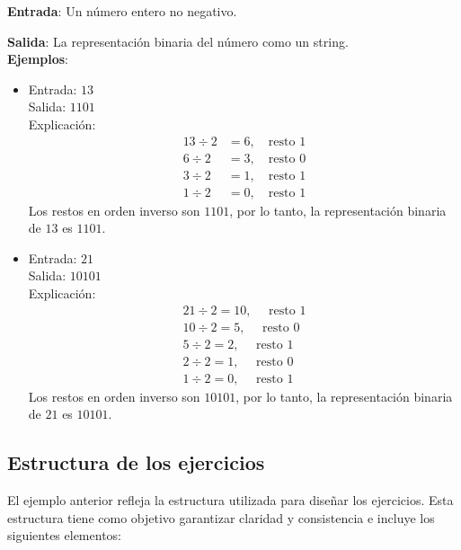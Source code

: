 \documentclass{article}
\begin{document}
\begin{enumerate}[label=\alph*)]
    \textbf{Entrada}: Un número entero no negativo.

    \textbf{Salida}: La representación binaria del número como un string.\\

    \textbf{Ejemplos}:
    \begin{itemize}
        \item Entrada: \( 13 \) \\
        Salida: \( \text{1101} \) \\
        Explicación:
        \[
        \begin{aligned}
        13 \div 2 &= 6, \quad \text{resto } 1 \\
        6 \div 2 &= 3, \quad \text{resto } 0 \\
        3 \div 2 &= 1, \quad \text{resto } 1 \\
        1 \div 2 &= 0, \quad \text{resto } 1
        \end{aligned}
        \]
        Los restos en orden inverso son \(1101\), por lo tanto, la representación binaria de \(13\) es \(1101\).

        \item Entrada: \( 21 \) \\
        Salida: \( \text{10101} \) \\
        Explicación:
        \[
        \begin{aligned}
        21 \div 2 = 10,\quad \text{ resto } 1 \\
        10 \div 2 = 5,\quad \text{ resto } 0 \\
        5 \div 2 = 2,\quad \text{ resto } 1 \\
        2 \div 2 = 1,\quad \text{ resto } 0 \\
        1 \div 2 = 0,\quad \text{ resto } 1
        \end{aligned}
        \]
        Los restos en orden inverso son \(10101\), por lo tanto, la representación binaria de \(21\) es \(10101\).
    \end{itemize}
\end{enumerate}

\subsection{Estructura de los ejercicios}
El ejemplo anterior refleja la estructura utilizada para diseñar los ejercicios. Esta estructura tiene como objetivo garantizar claridad y consistencia e incluye los siguientes elementos:
\end{document}
